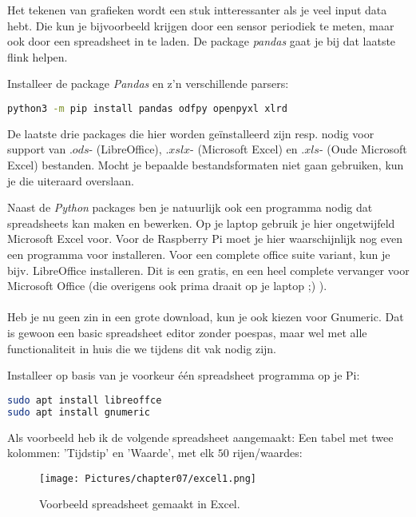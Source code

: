 Het tekenen van grafieken wordt een stuk intteressanter als je veel input data hebt. Die kun je bijvoorbeeld krijgen door een sensor periodiek te meten, maar ook door een spreadsheet in te laden. De package \textit{pandas} gaat je bij dat laatste flink helpen.

\begin{exercise}
Installeer de package \textit{Pandas} en z'n verschillende parsers:
\begin{lstlisting}[language=bash]
python3 -m pip install pandas odfpy openpyxl xlrd
\end{lstlisting}
De laatste drie packages die hier worden geïnstalleerd zijn resp. nodig voor support van $.ods$- (LibreOffice), $.xslx$- (Microsoft Excel) en $.xls$- (Oude Microsoft Excel) bestanden. Mocht je bepaalde bestandsformaten niet gaan gebruiken, kun je die uiteraard overslaan.
\end{exercise}

Naast de \textit{Python} packages ben je natuurlijk ook een programma nodig dat spreadsheets kan maken en bewerken. Op je laptop gebruik je hier ongetwijfeld Microsoft Excel voor. Voor de Raspberry Pi moet je hier waarschijnlijk nog even een programma voor installeren. Voor een complete office suite variant, kun je bijv. LibreOffice installeren. Dit is een gratis, en een heel complete vervanger voor Microsoft Office (die overigens ook prima draait op je laptop ;) ).\\\\ 
Heb je nu geen zin in een grote download, kun je ook kiezen voor Gnumeric. Dat is gewoon een basic spreadsheet editor zonder poespas, maar wel met alle functionaliteit in huis die we tijdens dit vak nodig zijn.

\begin{exercise}
Installeer op basis van je voorkeur één spreadsheet programma op je Pi:
\begin{lstlisting}[language=bash]
sudo apt install libreoffce
sudo apt install gnumeric
\end{lstlisting}
\end{exercise}

Als voorbeeld heb ik de volgende spreadsheet aangemaakt: Een tabel met twee kolommen: 'Tijdstip' en 'Waarde', met elk $50$ rijen/waardes: 
\begin{figure}[h!]
\centering\texttt{[image: Pictures/chapter07/excel1.png]}
\caption{Voorbeeld spreadsheet gemaakt in Excel.}
\label{fig:excel1} %
\end{figure}

